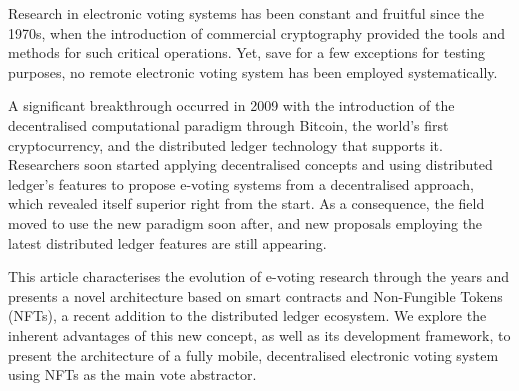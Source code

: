 \documentclass[../main.tex]{subfiles}
\begin{document}
Research in electronic voting systems has been constant and fruitful since the 1970s, when the introduction of commercial cryptography provided the tools and methods for such critical operations. Yet, save for a few exceptions for testing purposes, no remote electronic voting system has been employed systematically.
\par
A significant breakthrough occurred in 2009 with the introduction of the decentralised computational paradigm through Bitcoin, the world's first cryptocurrency, and the distributed ledger technology that supports it. Researchers soon started applying decentralised concepts and using distributed ledger's features to propose e-voting systems from a decentralised approach, which revealed itself superior right from the start. As a consequence, the field moved to use the new paradigm soon after, and new proposals employing the latest distributed ledger features are still appearing.
\par
This article characterises the evolution of e-voting research through the years and presents a novel architecture based on smart contracts and Non-Fungible Tokens (NFTs), a recent addition to the distributed ledger ecosystem. We explore the inherent advantages of this new concept, as well as its development framework, to present the architecture of a fully mobile, decentralised electronic voting system using NFTs as the main vote abstractor.
\end{document}
